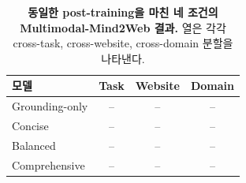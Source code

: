 \begin{table}[t]
\centering
\scriptsize
\setlength{\tabcolsep}{3pt}
\begin{tabularx}{\columnwidth}{@{}Xccc@{}}
\toprule
모델 & Task & Website & Domain \\
\midrule
Grounding-only & -- & -- & -- \\
Concise & -- & -- & -- \\
Balanced & -- & -- & -- \\
Comprehensive & -- & -- & -- \\
\bottomrule
\end{tabularx}
\caption{\textbf{동일한 post-training을 마친 네 조건의
Multimodal-Mind2Web 결과.} 열은 각각 cross-task, cross-website,
cross-domain 분할을 나타낸다.}
\label{tab:agent}
\end{table}
